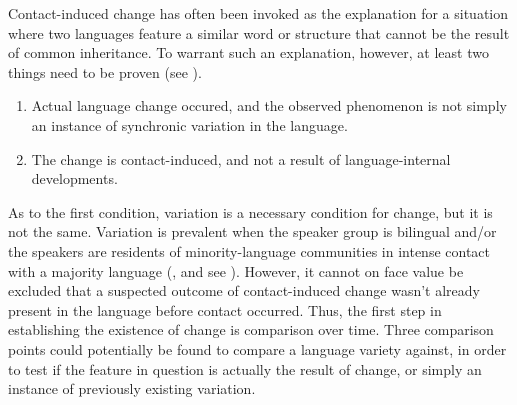 Contact-induced change has often been invoked as the explanation for a situation where two languages feature a similar word or structure that cannot be the result of common inheritance. To warrant such an explanation, however, at least two things need to be proven (see \cite{poplacklevey2010contact}).

\begin{enumerate}
	\item Actual language change occured, and the observed phenomenon is not simply an instance of synchronic variation in the language.
	\item The change is contact-induced, and not a result of language-internal developments.
\end{enumerate}

As to the first condition, variation is a necessary condition for change, but it is not the same. Variation is prevalent when the speaker group is bilingual and/or the speakers are residents of minority-language communities in intense contact with a majority language (\cites[394]{poplacklevey2010contact}, and see ). However, it cannot on face value be excluded that a suspected outcome of contact-induced change wasn't already present in the language before contact occurred. Thus, the first step in establishing the existence of change is comparison over time. Three comparison points could potentially be found to compare a language variety against, in order to test if the feature in question is actually the result of change, or simply an instance of previously existing variation. 

